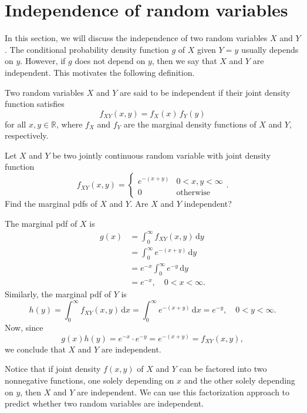 \section{Independence of random variables}

In this section, we will discuss the independence of two random variables $X$ and $Y$. The 
conditional probability density function $g$ of $X$ given $Y = y$ usually 
depends on $y$. However, if $g$ does not depend on $y$, then we say that $X$ and $Y$ are independent. 
This motivates the following definition.

\begin{definition}
    Two random variables $X$ and $Y$ are said to be independent if their joint density function satisfies
    \[
        f_{XY}(x, y) = f_X(x)\, f_Y(y)
    \]
    for all $x, y \in \mathbb{R}$, where $f_X$ and $f_Y$ are the marginal density functions of $X$ and $Y$, respectively.
\end{definition}

\begin{example}
    Let $X$ and $Y$ be two jointly continuous random variable with joint density function
    \[
        f_{XY}(x, y) = \begin{cases}
            e^{-(x+y)} & 0 < x,y < \infty\\
            0 & \text{otherwise}
        \end{cases}.
    \]
    Find the marginal pdfs of $X$ and $Y$. Are $X$ and $Y$ independent?
\end{example}
\begin{solution}
    The marginal pdf of $X$ is
    \begin{align*}
        g(x) &= \int_{0}^{\infty} f_{XY}(x,y) \, \mathrm{d}y\\
        &= \int_{0}^{\infty} e^{-(x+y)} \, \mathrm{d}y\\
        &= e^{-x} \int_{0}^{\infty} e^{-y} \, \mathrm{d}y\\
        &= e^{-x}, \quad 0 < x < \infty.
    \end{align*}
    Similarly, the marginal pdf of $Y$ is
    \[
        h(y) = \int_{0}^{\infty} f_{XY}(x,y) \, \mathrm{d}x = \int_{0}^{\infty} e^{-(x+y)} \, \mathrm{d}x = e^{-y}, \quad 0 < y < \infty.
    \]
    Now, since 
    \[
        g(x)h(y) = e^{-x} \cdot e^{-y} = e^{-(x+y)} = f_{XY}(x,y),
    \]
    we conclude that $X$ and $Y$ are independent.
\end{solution}

Notice that if joint density $f(x,y)$ of $X$ and $Y$ can be factored into two 
nonnegative functions, one solely depending on $x$ and the other solely 
depending on $y$, then $X$ and $Y$ are independent. 
We can use this factorization approach to predict whether two random variables are independent.

